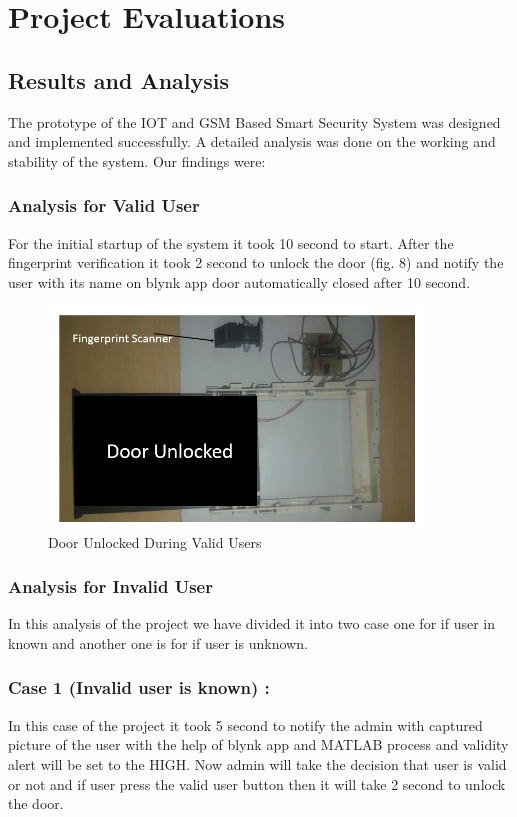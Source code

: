 \documentclass[twoside,a4paper,16pt]{book}
\begin{document}
{{			\chapter{Project Evaluations }
			\section{Results and Analysis}
			The prototype of the IOT and GSM Based Smart Security System was designed and implemented successfully. A detailed analysis was done on the working and stability of the system. Our findings were:
			\subsection{Analysis for Valid User}
			For the initial startup of the system it took 10 second to start. After the fingerprint verification it took 2 second to unlock the door (fig. 8) and notify the user with its name on blynk app door automatically closed after 10 second.
			\begin{figure}[ht!]
				\begin{center}
					\includegraphics[width=10.0cm]{ff.png}
					\caption{Door Unlocked During Valid Users }
				\end{center}
			\end{figure}
			\subsection{Analysis for Invalid User}
			In this analysis of the project we have divided it into two case one for if user in known and another one is for if user is unknown.
			\subsection*{Case 1 (Invalid user is known) :}
			In this case of the project it took 5 second to notify the admin with captured picture of the user with the help of blynk app  and MATLAB process  and validity alert will be set to the HIGH. Now admin will take the decision that user is valid or not and if user press the valid user button then it will take 2 second to unlock the door. 
}}
\end{document}
